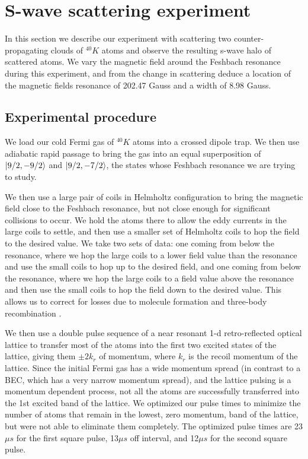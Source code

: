 \documentclass[12pt]{iopart}
\begin{document}
\section{S-wave scattering experiment}
In this section we describe our experiment with scattering two counter-propagating clouds of $^{40}K$ atoms and observe the resulting s-wave halo of scattered atoms. We vary the magnetic field around the Feshbach resonance during this experiment, and from the change in scattering deduce a location of the magnetic fields resonance of 202.47 Gauss and a width of 8.98 Gauss.
\subsection{Experimental procedure}
We load our cold Fermi gas of $^{40}K$ atoms into a crossed dipole trap. We then use adiabatic rapid passage to bring the gas into an equal superposition of $\mathinner{|{9/2,-9/2}\rangle}$ and $\mathinner{|{9/2,-7/2}\rangle}$, the states whose Feshbach resonance we are trying to study. 
\par We then use a large pair of  coils in Helmholtz configuration to bring the magnetic field close to the Feshbach resonance, but not close enough for significant collisions to occur. We hold the atoms there to allow the eddy currents in the large coils to settle, and then use a smaller set of Helmholtz coils to hop the field to the desired value. We take two sets of data: one coming from below the resonance, where we hop the large coils to a lower field value than the resonance and use the small coils to hop up to the desired field, and one coming from below the resonance, where we hop the large coils to a field value above the resonance and then use the small coils to hop the field down to the desired value. This allows us to correct for losses due to molecule formation and three-body recombination \cite{Chin10}.
\par We then use a double pulse sequence \cite{Wu05} of a near resonant 1-d retro-reflected optical lattice to transfer most of the atoms into the first two excited states of the lattice, giving them $\pm 2k_r$ of momentum, where $k_r$ is the recoil momentum of the lattice. Since the initial Fermi gas has a wide momentum spread (in contrast to a BEC, which has a very narrow momentum spread), and the lattice pulsing is a momentum dependent process, not all the atoms are successfully transferred into the 1st excited band of the lattice. We optimized our pulse times to minimize the number of atoms that remain in the lowest, zero momentum, band of the lattice, but were not able to eliminate them completely. The optimized pulse times are 23$\mu s$ for the first square pulse, 13$\mu s$ off interval, and 12$\mu s$ for the second square pulse. 
\end{document}
